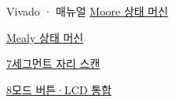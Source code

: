\begin{frame}{Vivado · 매뉴얼}
\small
\href{05.LAB2_06_MOORE_VIVADO.pdf}{Moore 상태 머신}\par\vspace{0.3cm}
\href{05.LAB2_07_MEALY_VIVADO.pdf}{Mealy 상태 머신}\par\vspace{0.3cm}
\href{05.LAB2_08_SEGMENT_SCAN_VIVADO.pdf}{7세그먼트 자리 스캔}\par\vspace{0.3cm}
\href{05.LAB2_08A_INTEGRATED_VIVADO.pdf}{8모드 버튼·LCD 통합}\par\vspace{0.3cm}
\end{frame}

